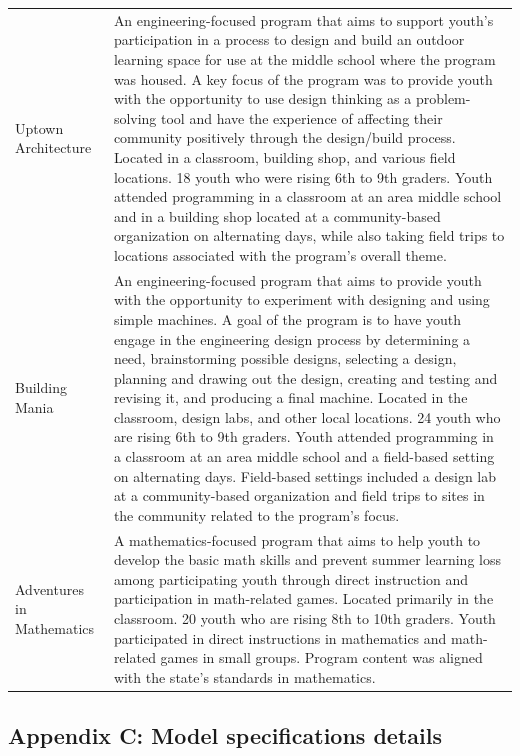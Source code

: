 \documentclass[]{msu-thesis}
\theoremstyle{definition}
\theoremstyle{definition}
\theoremstyle{definition}
\theoremstyle{remark}
\begin{document}
\begin{landscape}
\begin{table}
\begin{tabular}[t]{ll}
Uptown Architecture & An engineering-focused program that aims to support youth's participation in a process to design and build an outdoor learning space for use at the middle school where the program was housed. A key focus of the program was to provide youth with the opportunity to use design thinking as a problem-solving tool and have the experience of affecting their community positively through the design/build process. Located in a classroom, building shop, and various field locations. 18 youth who were rising 6th to 9th graders. Youth attended programming in a classroom at an area middle school and in a building shop located at a community-based organization on alternating days, while also taking field trips to locations associated with the program's overall theme.\\
Building Mania & An engineering-focused program that aims to provide youth with the opportunity to experiment with designing and using simple machines. A goal of the program is to have youth engage in the engineering design process by determining a need, brainstorming possible designs, selecting a design, planning and drawing out the design, creating and testing and revising it, and producing a final machine. Located in the classroom, design labs, and other local locations. 24 youth who are rising 6th to 9th graders. Youth attended programming in a classroom at an area middle school and a field-based setting on alternating days. Field-based settings included a design lab at a community-based organization and field trips to sites in the community related to the program's focus.\\
Adventures in Mathematics & A mathematics-focused program that aims to help youth to develop the basic math skills and prevent summer learning loss among participating youth through direct instruction and participation in math-related games. Located primarily in the classroom. 20 youth who are rising 8th to 10th graders. Youth participated in direct instructions in mathematics and math-related games in small groups. Program content was aligned with the state's standards in mathematics.\\
\bottomrule
\end{tabular}
\end{table}
\end{landscape}

\subsection{Appendix C: Model specifications
details}\label{appendix-c-model-specifications-details}
\end{document}
